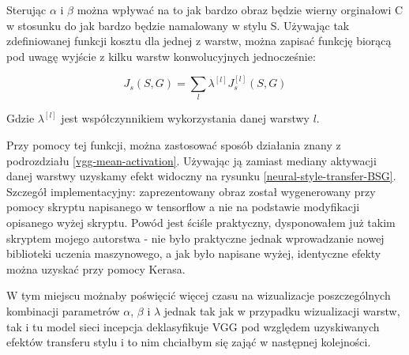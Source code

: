Sterując \(\alpha\) i \(\beta\) można wpływać na to jak bardzo obraz będzie wierny orginałowi C w stosunku do jak bardzo będzie namalowany w stylu S. Używając tak zdefiniowanej funkcji kosztu dla jednej 
z warstw, można zapisać funkcję biorącą pod uwagę wyjście z kilku warstw konwolucyjnych jednocześnie: 

\[J_{s}(S,G) = \sum_{l} \lambda^{[l]} J^{[l]}_{s}(S,G) \]

Gdzie \(\lambda^{[l]}\) jest współczynnikiem wykorzystania danej warstwy \(l\).

Przy pomocy tej funkcji, można zastosować sposób działania znany z podrozdziału \ref{vgg-mean-activation}. Używając ją zamiast mediany aktywacji danej warstwy uzyskamy efekt widoczny na rysunku \ref{neural-style-transfer-BSG}. Szczegół implementacyjny: zaprezentowany obraz został wygenerowany przy pomocy skryptu napisanego w tensorflow a nie na podstawie modyfikacji opisanego wyżej skryptu.
Powód jest ściśle praktyczny, dysponowałem już takim skryptem mojego autorstwa - nie było praktyczne jednak wprowadzanie nowej biblioteki uczenia maszynowego, a jak było napisane wyżej, identyczne efekty można uzyskać przy pomocy Kerasa.

W tym miejscu możnaby poświęcić więcej czasu na wizualizacje poszczególnych kombinacji parametrów \(\alpha\), \(\beta\) i \(\lambda\) jednak tak jak w przypadku wizualizacji warstw, tak i tu model sieci 
incepcja deklasyfikuje VGG pod względem uzyskiwanych efektów transferu stylu i to nim chciałbym się zająć w następnej kolejności.

